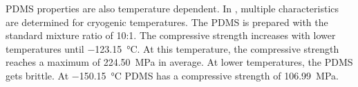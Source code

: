 PDMS properties are also temperature dependent. In \cite{Zhang.2020}, multiple characteristics are determined for cryogenic temperatures. The PDMS is prepared with the standard mixture ratio of 10:1. The compressive strength increases with lower temperatures until \SI{-123.15}{\degreeCelsius}. At this temperature, the compressive strength reaches a maximum of \SI{224.50}{\mega\pascal} in average. At lower temperatures, the PDMS gets brittle. At \SI{-150.15}{\degreeCelsius} PDMS has a compressive strength of \SI{106.99}{\mega\pascal}.



